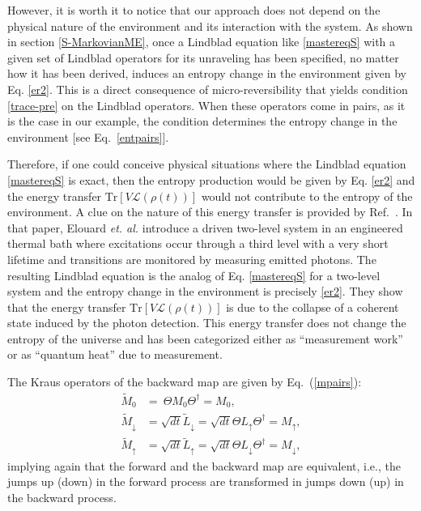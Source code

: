 \documentclass[aps,prx,twocolumn,showpacs,floatfix,superscriptaddress,graphics,longbibliography]{revtex4-1}
\newcommand{\tr}{\mathrm{Tr}}
\begin{document}
However, it is worth it to notice that our approach does not depend on the physical nature of the environment and its interaction with the system. As shown in section \ref{S-MarkovianME}, once a Lindblad equation like \eqref{mastereqS} with a given set of Lindblad operators for its unraveling has been specified, no matter how it has been derived, induces an entropy change in the environment given by Eq. \eqref{er2}. This is a direct consequence of micro-reversibility that yields condition \eqref{trace-pre} on the Lindblad operators. When these operators come in pairs, as it is the case in our example, the condition determines the entropy change in the environment [see Eq.~\eqref{entpairs}]. 

Therefore, if one could conceive physical situations where the Lindblad equation \eqref{mastereqS} is exact, then the entropy production would be given by Eq. \eqref{er2} and the energy transfer $\tr[V \mathcal{L}(\rho(t))]$ would not contribute to the entropy of the environment. A clue on the nature  of this energy transfer is provided by  Ref.~\cite{Auffeves2}. In that paper, Elouard \emph{et. al.} introduce  a driven two-level system in an engineered thermal bath where  excitations occur through a third level with a very short lifetime and transitions are monitored by measuring emitted photons. The resulting Lindblad equation is the analog of Eq. \eqref{mastereqS} for a two-level system and the entropy change in the environment is precisely \eqref{er2}. They show that the energy transfer $\tr[V \mathcal{L}(\rho(t))]$ is due to the collapse of a coherent state induced by the photon detection. This energy transfer  does not change the entropy of the universe and has been categorized either as ``measurement work'' \cite{JordanParrondo,JordanPRA} or as ``quantum heat'' \cite{Auffeves, Auffeves2} due to measurement. 

The Kraus operators of the backward map are given by  Eq.~(\ref{mpairs}):
\begin{align}
\tilde{M}_0 &=~ \Theta M_0 \Theta^\dagger = M_0,  \\
\tilde{M}_\downarrow &= \sqrt{dt} \tilde{L}_\downarrow = \sqrt{dt} \Theta L_\uparrow \Theta^\dagger = M_\uparrow,  \\ 
\tilde{M}_\uparrow &= \sqrt{dt} \tilde{L}_\uparrow = \sqrt{dt} \Theta L_\downarrow \Theta^\dagger = M_\downarrow, 
\end{align} 
implying again  that the forward and the backward map are equivalent, i.e., the jumps up (down) in the forward process are transformed in jumps down (up) in the backward process.
\end{document}
